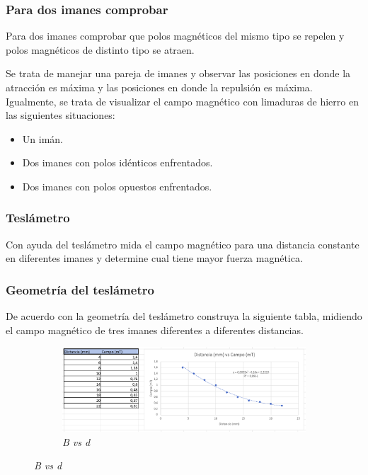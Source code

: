 \subsubsection{Para dos imanes comprobar}
Para dos imanes comprobar que polos magnéticos del mismo tipo se repelen y polos
magnéticos de distinto tipo se atraen.

Se trata de manejar una pareja de imanes y observar las posiciones en donde la
atracción es máxima y las posiciones en donde la repulsión es máxima.
Igualmente, se trata de visualizar el campo magnético con limaduras de hierro en
las siguientes situaciones:

\begin{itemize}
    \item Un imán.
    \item Dos imanes con polos idénticos enfrentados.
    \item Dos imanes con polos opuestos enfrentados.
\end{itemize}


\subsubsection{Teslámetro}
Con ayuda del teslámetro mida el campo magnético para una distancia constante en
diferentes imanes y determine cual tiene mayor fuerza magnética.


\subsubsection{Geometría del teslámetro}
De acuerdo con la geometría del teslámetro construya la siguiente tabla,
midiendo el campo magnético de tres imanes diferentes a diferentes distancias.

\begin{figure}[H]
    \centering
    \begin{subfigure}[b]{0.8\textwidth}
        \centering
        \includegraphics[width=\textwidth]{Figures/0. General/1.5.png}
        \caption{\textit{B vs d}}
        \label{fig: style 1 B vs d}
    \end{subfigure}
\end{figure}


